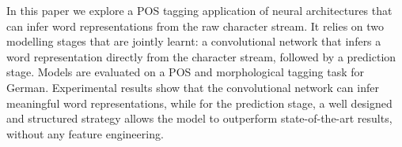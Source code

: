 In this paper we explore a POS tagging application of neural architectures that can infer word representations from the raw character stream. It relies on two modelling stages that are jointly learnt: a convolutional network that infers a word representation directly from the character stream, followed by a prediction stage. Models are evaluated on a POS and morphological tagging task for German. Experimental results show that the convolutional network can infer meaningful word representations, while for the prediction stage, a well designed and structured strategy allows the model to outperform state-of-the-art results, without any feature engineering.
